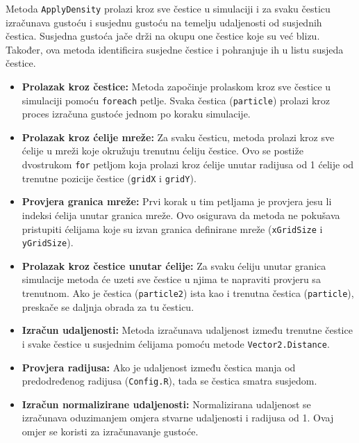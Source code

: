 \documentclass[diplomskirad]{fer}
\begin{document}
    Metoda \texttt{ApplyDensity} prolazi kroz sve čestice u simulaciji i za svaku česticu izračunava gustoću i susjednu gustoću na temelju udaljenosti od susjednih čestica.
    Susjedna gustoća jače drži na okupu one čestice koje su već blizu.
    Također, ova metoda identificira susjedne čestice i pohranjuje ih u listu susjeda čestice.



    \begin{itemize}
        \item \textbf{Prolazak kroz čestice:} Metoda započinje prolaskom kroz sve čestice u simulaciji pomoću \texttt{foreach} petlje.
        Svaka čestica (\texttt{particle}) prolazi kroz proces izračuna gustoće jednom po koraku simulacije.

        \item \textbf{Prolazak kroz ćelije mreže:} Za svaku česticu, metoda prolazi kroz sve ćelije u mreži koje okružuju trenutnu ćeliju čestice.
        Ovo se postiže dvostrukom \texttt{for} petljom koja prolazi kroz ćelije unutar radijusa od 1 ćelije od trenutne pozicije čestice (\texttt{gridX} i \texttt{gridY}).

        \item \textbf{Provjera granica mreže:} Prvi korak u tim petljama je provjera jesu li indeksi ćelija unutar granica mreže.
        Ovo osigurava da metoda ne pokušava pristupiti ćelijama koje su izvan granica definirane mreže (\texttt{xGridSize} i \texttt{yGridSize}).

        \item \textbf{Prolazak kroz čestice unutar ćelije:} Za svaku ćeliju unutar granica simulacije metoda će uzeti sve čestice u njima te napraviti provjeru sa trenutnom.
        Ako je čestica (\texttt{particle2}) ista kao i trenutna čestica (\texttt{particle}), preskače se daljnja obrada za tu česticu.

        \item \textbf{Izračun udaljenosti:} Metoda izračunava udaljenost između trenutne čestice i svake čestice u susjednim ćelijama pomoću metode \texttt{Vector2.Distance}.

        \item \textbf{Provjera radijusa:} Ako je udaljenost između čestica manja od predodređenog radijusa (\texttt{Config.R}), tada se čestica smatra susjedom.

        \item \textbf{Izračun normalizirane udaljenosti:} Normalizirana udaljenost se izračunava oduzimanjem omjera stvarne udaljenosti i radijusa od 1.
        Ovaj omjer se koristi za izračunavanje gustoće.


\end{itemize}
\end{document}

